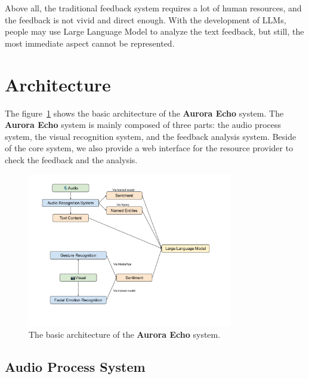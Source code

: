 \documentclass{article}
\begin{document}
    Above all, the traditional feedback system requires a lot of human resources, and the feedback is not vivid and direct enough.
    With the development of LLMs, people may use Large Language Model to analyze the text feedback, but still, the most immediate aspect cannot be represented.

    \section{Architecture}\label{sec:arch}

    The figure~\ref{fig:basic-arch} shows the basic architecture of the \textbf{Aurora Echo} system.
    The \textbf{Aurora Echo} system is mainly composed of three parts: the audio process system, the visual recognition system, and the feedback analysis system.
    Beside of the core system, we also provide a web interface for the resource provider to check the feedback and the analysis.

    \begin{figure}[hhhh]
        \centering
        \includegraphics[width=0.8\textwidth]{./figures/basic-arch}
        \caption{The basic architecture of the \textbf{Aurora Echo} system.}
        \label{fig:basic-arch}
    \end{figure}

    \subsection{Audio Process System}\label{subsec:audio}
\end{document}
